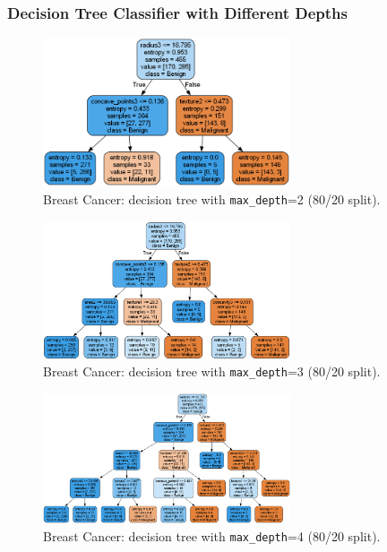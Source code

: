 \clearpage
\subsubsection*{Decision Tree Classifier with Different Depths}
\begin{figure}[H]
	\centering
	\includegraphics[width=0.65\textwidth]{imgs/dt-mini/dt__breast_cancer__80_vs_20__2.png}
	\caption{Breast Cancer: decision tree with \texttt{max\_depth}=2 (80/20 split).}\label{fig:bc-dt-depth-2}
\end{figure}

\begin{figure}[H]
	\centering
	\includegraphics[width=0.65\textwidth]{imgs/dt-mini/dt__breast_cancer__80_vs_20__3.png}
	\caption{Breast Cancer: decision tree with \texttt{max\_depth}=3 (80/20 split).}\label{fig:bc-dt-depth-3}
\end{figure}

\begin{figure}[H]
	\centering
	\includegraphics[width=0.65\textwidth]{imgs/dt-mini/dt__breast_cancer__80_vs_20__4.png}
	\caption{Breast Cancer: decision tree with \texttt{max\_depth}=4 (80/20 split).}\label{fig:bc-dt-depth-4}
\end{figure}

